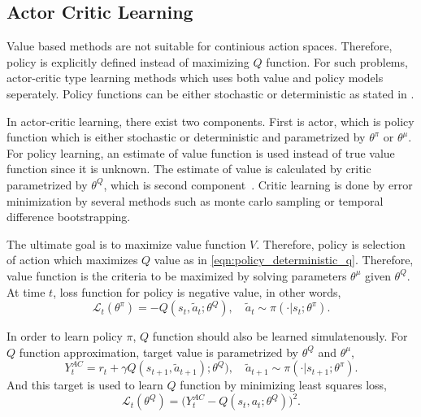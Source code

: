 \subsection{Actor Critic Learning}

Value based methods are not suitable for continious action spaces. 
Therefore, policy is explicitly defined instead of maximizing $Q$ function. 
For such problems, actor-critic type learning methods which uses both value and policy models seperately. 
Policy functions can be either stochastic or deterministic as stated in .  

In actor-critic learning, there exist two components. 
First is actor, which is policy function which is either stochastic or deterministic and parametrized by $\theta^{\pi}$ or $\theta^{\mu}$. 
For policy learning, an estimate of value function is used instead of true value function since it is unknown. 
The estimate of value is calculated by critic parametrized by $\theta^Q$, which is second component~\cite{silver_deterministic_2014}. 
Critic learning is done by error minimization by several methods such as monte carlo sampling or temporal difference bootstrapping.

The ultimate goal is to maximize value function $V$. Therefore, policy is selection of action which maximizes $Q$ value as in \eqref{eqn:policy_deterministic_q}. 
Therefore, value function is the criteria to be maximized by solving parameters $\theta^\mu$ given $\theta^Q$. At time $t$, loss function for policy is negative value, in other words,  
\begin{equation}
\label{eqn:ac_value_maximization}
\mathcal{L}_t(\theta^\pi) = - Q(s_t, \widetilde{a}_t;\theta^Q), \quad \widetilde{a}_t \sim \pi(\cdot|s_t;\theta^\pi).
\end{equation}

In order to learn policy $\pi$, $Q$ function should also be learned simulatenously. 
For $Q$ function approximation, target value is parametrized by $\theta^Q$ and $\theta^\mu$,
\begin{equation}
\label{eqn:ac_target}
Y_t^{AC} = r_t + \gamma Q(s_{t+1}, \widetilde{a}_{t+1});\theta^Q), \quad \widetilde{a}_{t+1} \sim \pi(\cdot|s_{t+1};\theta^{\pi}).
\end{equation}
And this target is used to learn $Q$ function by minimizing least squares loss,
\begin{equation}
\label{eqn:ac_loss}
\mathcal{L}_t(\theta^Q) = \big( Y_t^{AC} - Q(s_t,a_t;\theta^Q) \big) ^ 2.
\end{equation}

